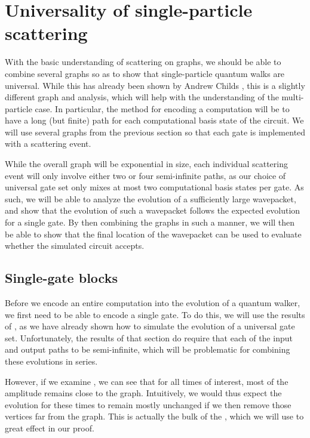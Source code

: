 \documentclass[../thesis-main/thesis-main]{subfiles}
\begin{document}
\chapter{Universality of single-particle scattering}
\label{chap:SP_universality}


With the basic understanding of scattering on graphs, we should be able to combine several graphs so as to show that single-particle quantum walks are universal.  While this has already been shown by Andrew Childs \cite{Chi09}, this is a slightly different graph and analysis, which will help with the understanding of the multi-particle case.  In particular, the method for encoding a computation will be to have a long (but finite) path for each computational basis state of the circuit.  We will use several graphs from the previous section so that each gate is implemented with a scattering event.  

While the overall graph will be exponential in size, each individual scattering event will only involve either two or four semi-infinite paths, as our choice of universal gate set only mixes at most two computational basis states per gate.  As such, we will be able to analyze the evolution of a sufficiently large wavepacket, and show that the evolution of such a wavepacket follows the expected evolution for a single gate.  By then combining the graphs in such a manner, we will then be able to show that the final location of the wavepacket can be used to evaluate whether the simulated circuit accepts.



\section{Single-gate blocks}
\label{sec:single_gate_blocks}

Before we encode an entire computation into the evolution of a quantum walker, we first need to be able to encode a single gate.  To do this, we will use the results of , as we have already shown how to simulate the evolution of a universal gate set.  Unfortunately, the results of that section do require that each of the input and output paths to be semi-infinite, which will be problematic for combining these evolutions in series.

However, if we examine , we can see that for all times of interest, most of the amplitude remains close to the graph.  Intuitively, we would thus expect the evolution for these times to remain mostly unchanged if we then remove those vertices far from the graph.  This is actually the bulk of the , which we will use to great effect in our proof.
\end{document}
